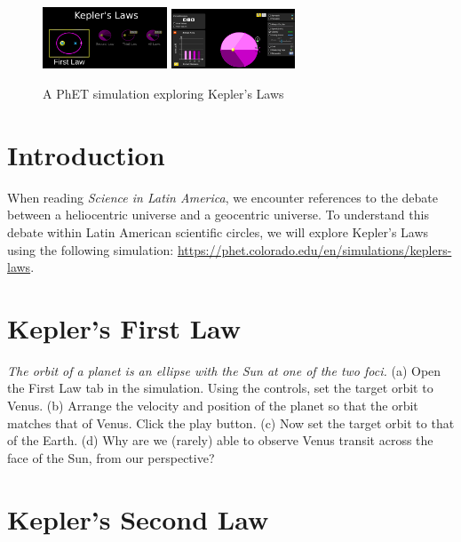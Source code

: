 \documentclass[12pt]{article}
\begin{document}
\maketitle

\small

\begin{figure}[ht]
\centering
\includegraphics[width=0.33\textwidth]{kepler3.png}
\includegraphics[width=0.33\textwidth]{kepler2.png}
\caption{\label{fig:1b} A PhET simulation exploring Kepler's Laws}
\end{figure}

\section{Introduction}

When reading \textit{Science in Latin America}, we encounter references to the debate between a heliocentric universe and a geocentric universe.  To understand this debate within Latin American scientific circles, we will explore Kepler's Laws using the following simulation: \url{https://phet.colorado.edu/en/simulations/keplers-laws}.

\section{Kepler's First Law}

\textit{The orbit of a planet is an ellipse with the Sun at one of the two foci.}  (a) Open the First Law tab in the simulation.  Using the controls, set the target orbit to Venus.  (b) Arrange the velocity and position of the planet so that the orbit matches that of Venus. Click the play button.  (c) Now set the target orbit to that of the Earth.  (d) Why are we (rarely) able to observe Venus transit across the face of the Sun, from our perspective? \\ \vspace{0.25cm}

\section{Kepler's Second Law}
\end{document}
